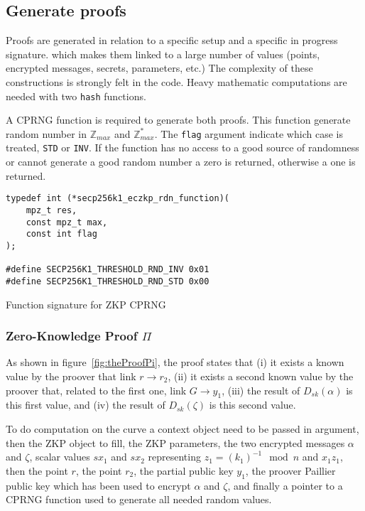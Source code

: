 \subsection{Generate proofs}

Proofs are generated in relation to a specific setup and a specific in progress
signature. which makes them linked to a large number of values (points,
encrypted messages, secrets, parameters, etc.) The complexity of these
constructions is strongly felt in the code. Heavy mathematic computations are
needed with two \texttt{hash} functions.

A CPRNG function is required to generate both proofs. This function generate
random number in $\mathbb{Z}_{max}$ and $\mathbb{Z}_{max}^*$. The \texttt{flag}
argument indicate which case is treated, \texttt{STD} or \texttt{INV}. If the
function has no access to a good source of randomness or cannot generate a good
random number a zero is returned, otherwise a one is returned.

\begin{listing}
  \begin{verbatim}
typedef int (*secp256k1_eczkp_rdn_function)(
    mpz_t res,
    const mpz_t max,
    const int flag
);

#define SECP256K1_THRESHOLD_RND_INV 0x01
#define SECP256K1_THRESHOLD_RND_STD 0x00
  \end{verbatim}
	\caption{Function signature for ZKP CPRNG}
	\label{lst:funcSigZKPCPRGN}
\end{listing}

\subsubsection{Zero-Knowledge Proof $\Pi$}

As shown in figure~\ref{fig:theProofPi}, the proof states that (i) it exists a
known value by the proover that link $r \rightarrow r_2$, (ii) it exists a
second known value by the proover that, related to the first one, link $G
\rightarrow y_1$, (iii) the result of $D_{sk}(\alpha)$ is this first value, and
(iv) the result of $D_{sk}(\zeta)$ is this second value.

To do computation on the curve a context object need to be passed in argument,
then the ZKP object to fill, the ZKP parameters, the two encrypted messages
$\alpha$ and $\zeta$, scalar values $sx_1$ and $sx_2$ representing $z_1 =
(k_1)^{-1} \mod n$ and $x_1z_1$, then the point $r$, the point $r_2$, the
partial public key $y_1$, the proover Paillier public key which has been used to
encrypt $\alpha$ and $\zeta$, and finally a pointer to a CPRNG function used to
generate all needed random values.

